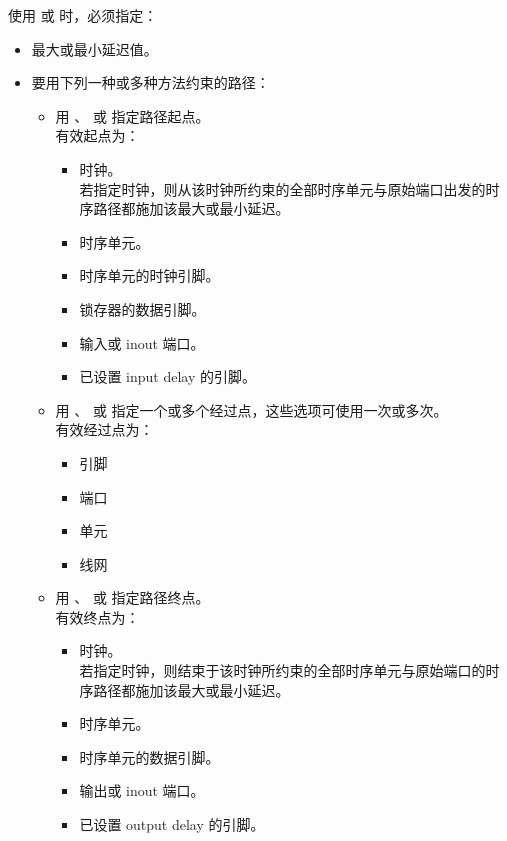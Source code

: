 使用  或  时，必须指定：
\begin{itemize}
  \item 最大或最小延迟值。
  \item 要用下列一种或多种方法约束的路径：
        \begin{itemize}
          \item 用 、 或  指定路径起点。\\
                有效起点为：
                \begin{itemize}
                  \item 时钟。\\
                        若指定时钟，则从该时钟所约束的全部时序单元与原始端口出发的时序路径都施加该最大或最小延迟。
                  \item 时序单元。
                  \item 时序单元的时钟引脚。
                  \item 锁存器的数据引脚。
                  \item 输入或 inout 端口。
                  \item 已设置 input delay 的引脚。
                \end{itemize}
          \item 用 、 或  指定一个或多个经过点，这些选项可使用一次或多次。\\
                有效经过点为：
                \begin{itemize}
                  \item 引脚
                  \item 端口
                  \item 单元
                  \item 线网
                \end{itemize}
          \item 用 、 或  指定路径终点。\\
                有效终点为：
                \begin{itemize}
                  \item 时钟。\\
                        若指定时钟，则结束于该时钟所约束的全部时序单元与原始端口的时序路径都施加该最大或最小延迟。
                  \item 时序单元。
                  \item 时序单元的数据引脚。
                  \item 输出或 inout 端口。
                  \item 已设置 output delay 的引脚。
                \end{itemize}
        \end{itemize}
\end{itemize}

